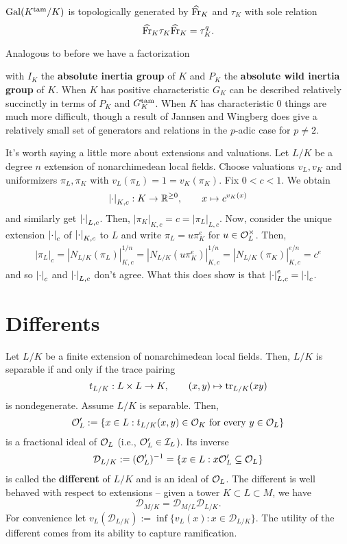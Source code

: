 \documentclass[11pt]{article}
\newcommand{\D}{\mathcal{D}}
\newcommand{\Fr}{\textup{Fr}} %
\newcommand{\tam}{\textup{tam}} %
\begin{document}
\begin{theorem}[Iwasawa]
$\Gal(K^{\tam}/K)$ is topologically generated by $\w{\Fr}_K$ and $\tau_K$ with sole relation 
$$\w{\Fr}_K\tau_K\w{\Fr}_K=\tau_K^q.$$
\end{theorem}

Analogous to before we have a factorization
\begin{center}
\end{center}
with $I_K$ the \textbf{absolute inertia group} of $K$ and $P_K$ the \textbf{absolute wild inertia group} of $K$. When $K$ has positive characteristic $G_K$ can be described relatively succinctly in terms of $P_K$ and $G_K^{\tam}$. When $K$ has characteristic $0$ things are much more difficult, though a result of Jannsen and Wingberg does give a relatively small set of generators and relations in the $p$-adic case for $p\neq2$.

\begin{remark}
It's worth saying a little more about extensions and valuations. Let $L/K$ be a degree $n$ extension of nonarchimedean local fields. Choose valuations $v_L,v_K$ and uniformizers $\pi_L,\pi_K$ with $v_L(\pi_L)=1=v_K(\pi_K)$. Fix $0<c<1$. We obtain 
$$\left\lvert\cdot\right\rvert_{K,c}: K\to\mathbb{R}^{\geq0},\qquad x\mapsto c^{v_K(x)}$$
and similarly get $\left\lvert\cdot\right\rvert_{L,c}$. Then, $|\pi_K|_{K,c}=c=|\pi_L|_{L,c}$. Now, consider the unique extension $\left\lvert\cdot\right\rvert_c$ of $\left\lvert\cdot\right\rvert_{K,c}$ to $L$ and write $\pi_L=u\pi_K^e$ for $u\in\mathcal{O}_L^{\times}$. Then, 
\begin{align*}
|\pi_L|_c
=|N_{L/K}(\pi_L)|_{K,c}^{1/n}
=|N_{L/K}(u\pi_K^e)|_{K,c}^{1/n}
=|N_{L/K}(\pi_K)|_{K,c}^{e/n}
=c^e
\end{align*}
and so $\left\lvert\cdot\right\rvert_c$ and $\left\lvert\cdot\right\rvert_{L,c}$ don't agree. What this does show is that $\left\lvert\cdot\right\rvert_{L,c}^e=\left\lvert\cdot\right\rvert_c$.
\end{remark}

\section{Differents}
Let $L/K$ be a finite extension of nonarchimedean local fields. Then, $L/K$ is separable if and only if the trace pairing
$$t_{L/K}: L\times L\to K,\qquad (x,y)\mapsto\operatorname{tr}_{L/K}(xy)$$
is nondegenerate. Assume $L/K$ is separable. Then,
$$\mathcal{O}_L':=\{x\in L : t_{L/K}(x,y)\in\mathcal{O}_K\textrm{ for every }y\in\mathcal{O}_L\}$$
is a fractional ideal of $\mathcal{O}_L$ (i.e., $\mathcal{O}_L'\in\mathcal{I}_L$). Its inverse
$$\D_{L/K}:=(\O_L')^{-1}=\{x\in L : x\O_L'\subset\O_L\}$$
is called the \textbf{different} of $L/K$ and is an ideal of $\mathcal{O}_L$. The different is well behaved with respect to extensions -- given a tower $K\subset L\subset M$, we have 
$$\D_{M/K}=\D_{M/L}\D_{L/K}.$$
For convenience let $v_L(\D_{L/K}):=\inf\{v_L(x) : x\in\D_{L/K}\}$. The utility of the different comes from its ability to capture ramification.
\end{document}
